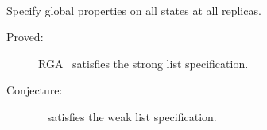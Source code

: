 \begin{frame}{}

  \vspace{0.30cm}
  \begin{center}
    ~ \\[6pt]
    {Specify global properties on all states at all replicas.}
  \end{center}

  \pause
  \vspace{0.30cm}
  \begin{center}
    \begin{description}
      \item[Proved:] RGA~ satisfies the strong list specification.
      \item[Conjecture:] ~ satisfies the weak list specification.
    \end{description}
  \end{center}
\end{frame}
